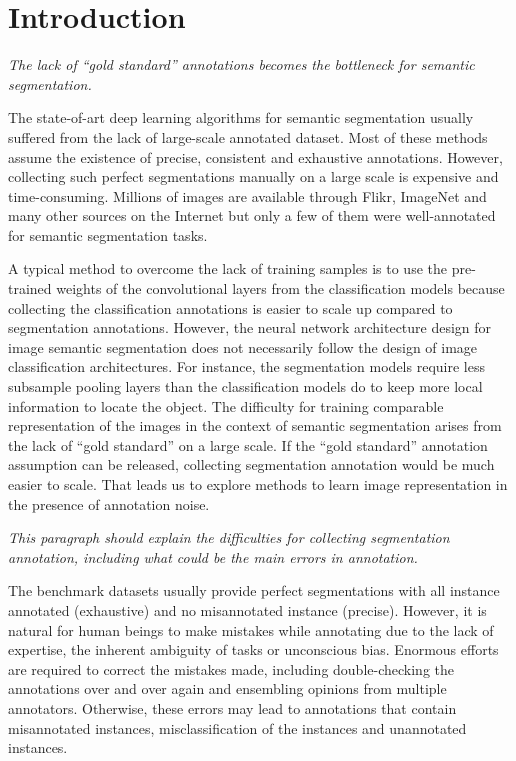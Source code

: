 \section{Introduction}
\label{introduction}

\noindent
\textit{The lack of ``gold standard'' annotations becomes the bottleneck for semantic segmentation.}

\noindent
The state-of-art deep learning algorithms for semantic segmentation \cite{long2015fully} usually suffered from the lack of large-scale annotated dataset.
Most of these methods assume the existence of precise, consistent and exhaustive annotations. However, collecting such perfect segmentations manually on a large scale is expensive and time-consuming.
Millions of images are available through Flikr, ImageNet and many other sources on the Internet but only a few of them \cite{everingham2015pascal,mottaghi2014role,lin2014microsoft}
were well-annotated for semantic segmentation tasks.

\noindent
A typical method to overcome the lack of training samples is to use the pre-trained weights of the convolutional layers from the classification models because collecting the classification annotations is easier to scale up compared to segmentation annotations.
However, the neural network architecture design for image semantic segmentation does not necessarily follow the design of image classification architectures.
For instance, the segmentation models require less subsample pooling layers than the classification models do to keep more local information to locate the object.
The difficulty for training comparable representation of the images in the context of semantic segmentation arises from the lack of ``gold standard'' on a large scale.
If the ``gold standard'' annotation assumption can be released, collecting segmentation annotation would be much easier to scale.
That leads us to explore methods to learn image representation in the presence of annotation noise.



\noindent
\textit{This paragraph should explain the difficulties for collecting segmentation annotation, including what could be the main errors in annotation.}

\noindent
The benchmark datasets usually provide perfect segmentations with all instance annotated (exhaustive) and no misannotated instance (precise).
However, it is natural for human beings to make mistakes while annotating due to the lack of expertise, the inherent ambiguity of tasks or unconscious bias.
Enormous efforts are required to correct the mistakes made, including double-checking the annotations over and over again and ensembling opinions from multiple annotators.
Otherwise, these errors may lead to annotations that contain misannotated instances, misclassification of the instances and unannotated instances.



